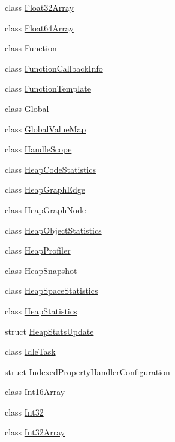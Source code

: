 \begin{DoxyCompactItemize}
\item 
class \mbox{\hyperlink{classv8_1_1Float32Array}{Float32\+Array}}
\item 
class \mbox{\hyperlink{classv8_1_1Float64Array}{Float64\+Array}}
\item 
class \mbox{\hyperlink{classv8_1_1Function}{Function}}
\item 
class \mbox{\hyperlink{classv8_1_1FunctionCallbackInfo}{Function\+Callback\+Info}}
\item 
class \mbox{\hyperlink{classv8_1_1FunctionTemplate}{Function\+Template}}
\item 
class \mbox{\hyperlink{classv8_1_1Global}{Global}}
\item 
class \mbox{\hyperlink{classv8_1_1GlobalValueMap}{Global\+Value\+Map}}
\item 
class \mbox{\hyperlink{classv8_1_1HandleScope}{Handle\+Scope}}
\item 
class \mbox{\hyperlink{classv8_1_1HeapCodeStatistics}{Heap\+Code\+Statistics}}
\item 
class \mbox{\hyperlink{classv8_1_1HeapGraphEdge}{Heap\+Graph\+Edge}}
\item 
class \mbox{\hyperlink{classv8_1_1HeapGraphNode}{Heap\+Graph\+Node}}
\item 
class \mbox{\hyperlink{classv8_1_1HeapObjectStatistics}{Heap\+Object\+Statistics}}
\item 
class \mbox{\hyperlink{classv8_1_1HeapProfiler}{Heap\+Profiler}}
\item 
class \mbox{\hyperlink{classv8_1_1HeapSnapshot}{Heap\+Snapshot}}
\item 
class \mbox{\hyperlink{classv8_1_1HeapSpaceStatistics}{Heap\+Space\+Statistics}}
\item 
class \mbox{\hyperlink{classv8_1_1HeapStatistics}{Heap\+Statistics}}
\item 
struct \mbox{\hyperlink{structv8_1_1HeapStatsUpdate}{Heap\+Stats\+Update}}
\item 
class \mbox{\hyperlink{classv8_1_1IdleTask}{Idle\+Task}}
\item 
struct \mbox{\hyperlink{structv8_1_1IndexedPropertyHandlerConfiguration}{Indexed\+Property\+Handler\+Configuration}}
\item 
class \mbox{\hyperlink{classv8_1_1Int16Array}{Int16\+Array}}
\item 
class \mbox{\hyperlink{classv8_1_1Int32}{Int32}}
\item 
class \mbox{\hyperlink{classv8_1_1Int32Array}{Int32\+Array}}
\item 

\end{DoxyCompactItemize}
